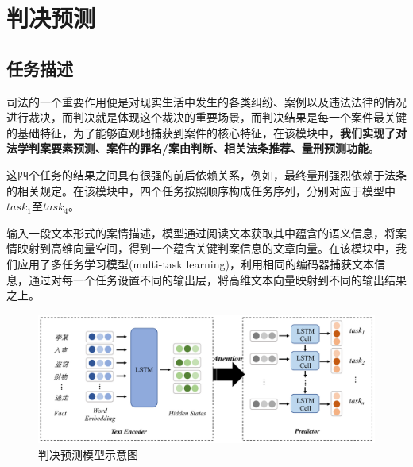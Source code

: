 \section{判决预测}
\subsection{任务描述}
司法的一个重要作用便是对现实生活中发生的各类纠纷、案例以及违法法律的情况进行裁决，而判决就是体现这个裁决的重要场景，而判决结果是每一个案件最关键的基础特征，为了能够直观地捕获到案件的核心特征，在该模块中，\textbf{我们实现了对法学判案要素预测、案件的罪名/案由判断、相关法条推荐、量刑预测功能}。

这四个任务的结果之间具有很强的前后依赖关系，例如，最终量刑强烈依赖于法条的相关规定。在该模块中，四个任务按照顺序构成任务序列，分别对应于模型中$task_{1}$至$task_{4}$。

输入一段文本形式的案情描述，模型通过阅读文本获取其中蕴含的语义信息，将案情映射到高维向量空间，得到一个蕴含关键判案信息的文章向量。在该模块中，我们应用了多任务学习模型(multi-task learning)，利用相同的编码器捕获文本信息，通过对每一个任务设置不同的输出层，将高维文本向量映射到不同的输出结果之上。

\begin{figure}[ht]
    \centering
    \includegraphics[width=\linewidth]{figures/model1}
    \caption{判决预测模型示意图}
    \label{fig:model1}
\end{figure}

